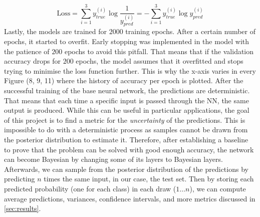 \documentclass[11pt,twoside]{article}
\numberwithin{Theorem}{section}
\numberwithin{Definition}{section}
\numberwithin{Lemma}{section}
\numberwithin{Algorithm}{section}
\numberwithin{equation}{section}
\begin{document}
\begin{equation}
\text{Loss} = \sum_{i=1}^{3} y_{true}^{(i)} \log{\frac{1}{y_{pred}^{(i)}}} = -\sum_{i=1}^{3} y_{true}^{(i)} \log y_{pred}^{(i)}
\end{equation}
Lastly, the models are trained for $2000$ training epochs. After a certain number of epochs, it started to overfit. Early stopping was implemented in the model with the patience of $200$ epochs to avoid this pitfall. That means that if the validation accuracy drops for $200$ epochs, the model assumes that it overfitted and stops trying to minimise the loss function further. This is why the x-axis varies in every Figure (8, 9, 11) where the history of accuracy per epoch is plotted.
After the successful training of the base neural network, the predictions are deterministic. That means that each time a specific input is passed through the NN, the same output is produced. While this can be useful in particular applications, the goal of this project is to find a metric for the \textit{uncertainty} of the predictions. This is impossible to do with a deterministic process as samples cannot be drawn from the posterior distribution to estimate it. Therefore, after establishing a baseline to prove that the problem can be solved with good enough accuracy, the network can become Bayesian by changing some of its layers to Bayesian layers. Afterwards, we can sample from the posterior distribution of the predictions by predicting $n$ times the same input, in our case, the test set. Then by storing each predicted probability (one for each class) in each draw ($1 \dots n$), we can compute average predictions, variances, confidence intervals, and more metrics discussed in \autoref{sec:results}.
\end{document}
